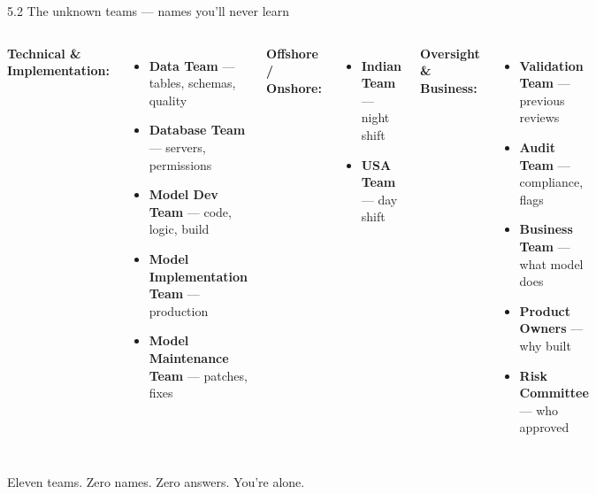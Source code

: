 \documentclass[aspectratio=169, 11pt]{beamer}
\begin{document}
\begin{frame}{5.2 The unknown teams — names you'll never learn}
	\begin{columns}[T]
		\scriptsize
		\textbf{Technical \& Implementation:}
		\begin{itemize}
			\item \textbf{Data Team} — tables, schemas, quality
			\item \textbf{Database Team} — servers, permissions
			\item \textbf{Model Dev Team} — code, logic, build
			\item \textbf{Model Implementation Team} — production
			\item \textbf{Model Maintenance Team} — patches, fixes
		\end{itemize}
		\vspace{0.1cm}
		\textbf{Offshore / Onshore:}
		\begin{itemize}
			\item \textbf{Indian Team} — night shift
			\item \textbf{USA Team} — day shift
		\end{itemize}
		
		\scriptsize
		\textbf{Oversight \& Business:}
		\begin{itemize}
			\item \textbf{Validation Team} — previous reviews
			\item \textbf{Audit Team} — compliance, flags
			\item \textbf{Business Team} — what model does
			\item \textbf{Product Owners} — why built
			\item \textbf{Risk Committee} — who approved
		\end{itemize}
	\end{columns}
	
	\vspace{0.1cm}
	\tiny\alert{Eleven teams. Zero names. Zero answers. You're alone.}
\end{frame}
\end{document}
